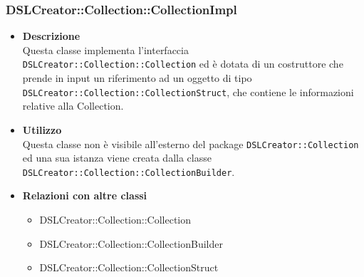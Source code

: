  \subsubsection{DSLCreator::Collection::CollectionImpl}
                    \begin{itemize}
                        \item \textbf{Descrizione} \hfill \\
                            Questa classe implementa l'interfaccia \texttt{DSLCreator::Collection::Collection} ed è dotata di un costruttore che prende in input un riferimento ad un oggetto di tipo \texttt{DSLCreator::Collection::CollectionStruct}, che contiene le informazioni relative alla Collection.
                        \item \textbf{Utilizzo} \hfill \\
                            Questa classe non è visibile all'esterno del package \texttt{DSLCreator::Collection} ed una sua istanza viene creata dalla classe \texttt{DSLCreator::Collection::CollectionBuilder}.
                        \item \textbf{Relazioni con altre classi}
                            \begin{itemize}
                              \item DSLCreator::Collection::Collection
                              \item DSLCreator::Collection::CollectionBuilder
                              \item DSLCreator::Collection::CollectionStruct
                            \end{itemize}
                    \end{itemize}


